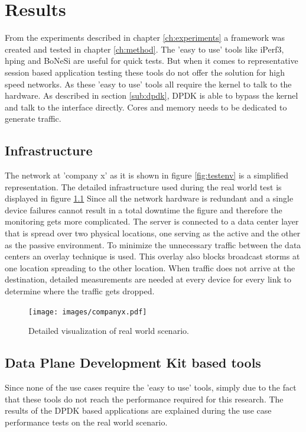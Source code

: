 \chapter{Results}\label{ch:results}

From the experiments described in chapter \ref{ch:experiments} a framework was created and tested in chapter \ref{ch:method}. 
The 'easy to use' tools like iPerf3, hping and BoNeSi are useful for quick tests. But when it comes to representative session based application testing these tools do not offer the solution for high speed networks. 
As these 'easy to use' tools all require the kernel to talk to the hardware. As described in section \ref{sub:dpdk}, DPDK is able to bypass the kernel and talk to the interface directly. Cores and memory needs to be dedicated to generate traffic.  

\section{Infrastructure}
The network at 'company x' as it is shown in figure \ref{fig:testenv} is a simplified representation.
The detailed infrastructure used during the real world test is displayed in figure \ref{fig:companyx} 
Since all the network hardware is redundant and a single device failures cannot result in a total downtime the figure and therefore the monitoring gets more complicated.
The server is connected to a data center layer that is spread over two physical locations, one serving as the active and the other as the passive environment.
To minimize the unnecessary traffic between the data centers an overlay technique is used. This overlay also blocks broadcast storms at one location spreading to the other location.  
When traffic does not arrive at the destination, detailed measurements are needed at every device for every link to determine where the traffic gets dropped.   

\begin{figure}[H] 
  \texttt{[image: images/companyx.pdf]}
  \caption{Detailed visualization of real world scenario.}
  \label{fig:companyx}
\end{figure}

\section{Data Plane Development Kit based tools}
Since none of the use cases require the 'easy to use' tools, simply due to the fact that these tools do not reach the performance required for this research. 
The results of the DPDK based applications are explained during the use case performance tests on the real world scenario.
  
